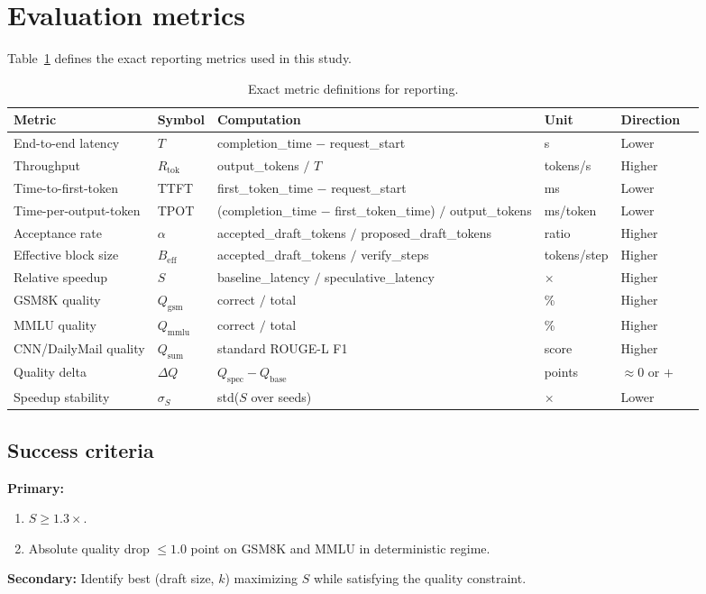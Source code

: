 \section{Evaluation metrics}
\label{sec:metrics}

Table~\ref{tab:metrics} defines the exact reporting metrics used in this study.

\begin{table}[t]
\centering
\caption{Exact metric definitions for reporting.}
\label{tab:metrics}
\small
\begin{tabular}{llllll}
\hline
\textbf{Metric} & \textbf{Symbol} & \textbf{Computation} & \textbf{Unit} & \textbf{Direction} \\
\hline
End-to-end latency & $T$ & completion\_time $-$ request\_start & s & Lower \\
Throughput & $R_{\text{tok}}$ & output\_tokens $/$ $T$ & tokens/s & Higher \\
Time-to-first-token & TTFT & first\_token\_time $-$ request\_start & ms & Lower \\
Time-per-output-token & TPOT & (completion\_time $-$ first\_token\_time) $/$ output\_tokens & ms/token & Lower \\
Acceptance rate & $\alpha$ & accepted\_draft\_tokens $/$ proposed\_draft\_tokens & ratio & Higher \\
Effective block size & $B_{\text{eff}}$ & accepted\_draft\_tokens $/$ verify\_steps & tokens/step & Higher \\
Relative speedup & $S$ & baseline\_latency $/$ speculative\_latency & $\times$ & Higher \\
GSM8K quality & $Q_{\text{gsm}}$ & correct $/$ total & \% & Higher \\
MMLU quality & $Q_{\text{mmlu}}$ & correct $/$ total & \% & Higher \\
CNN/DailyMail quality & $Q_{\text{sum}}$ & standard ROUGE-L F1 & score & Higher \\
Quality delta & $\Delta Q$ & $Q_{\text{spec}} - Q_{\text{base}}$ & points & $\approx 0$ or $+$ \\
Speedup stability & $\sigma_S$ & std($S$ over seeds) & $\times$ & Lower \\
\hline
\end{tabular}
\end{table}

\subsection{Success criteria}

\noindent\textbf{Primary:}
\begin{enumerate}
    \item $S \geq 1.3\times$.
    \item Absolute quality drop $\leq 1.0$ point on GSM8K and MMLU in deterministic regime.
\end{enumerate}

\noindent\textbf{Secondary:} Identify best (draft size, $k$) maximizing $S$ while satisfying the quality constraint.
